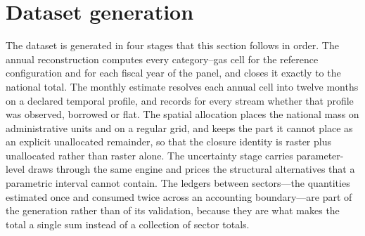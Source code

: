 \section{Dataset generation}
\label{sec:generation}

The dataset is generated in four stages that this section follows in order. The annual
reconstruction computes every category--gas cell for the reference configuration and for
each fiscal year of the panel, and closes it exactly to the national total. The monthly
estimate resolves each annual cell into twelve months on a declared temporal profile, and
records for every stream whether that profile was observed, borrowed or flat. The spatial
allocation places the national mass on administrative units and on a regular grid, and
keeps the part it cannot place as an explicit unallocated remainder, so that the closure
identity is raster plus unallocated rather than raster alone. The uncertainty stage carries
parameter-level draws through the same engine and prices the structural alternatives that a
parametric interval cannot contain. The ledgers between sectors---the quantities estimated
once and consumed twice across an accounting boundary---are part of the generation rather
than of its validation, because they are what makes the total a single sum instead of a
collection of sector totals.

\pkinvLeadFragment

\pkinvEndFragment

\pkinvDemoteFragment

\pkinvEndFragment

\pkinvDemoteFragment

\pkinvEndFragment
